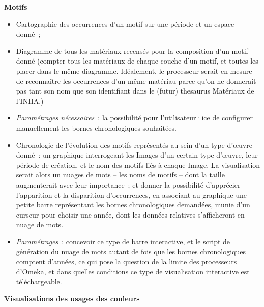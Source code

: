 \documentclass[a4paper,12pt, twoside]{book}
\begin{document}
\large \textbf{\textcolor{teal2}{Motifs}}\\

\normalsize
\begin{itemize}
    \item Cartographie des occurrences d’un motif sur une période et un espace donné~;\\

    \item Diagramme de tous les matériaux recensés pour la composition d’un motif donné (compter tous les matériaux de chaque couche d’un motif, et toutes les placer dans le même diagramme. Idéalement, le processeur serait en mesure de reconnaître les occurrences d’un même matériau parce qu’on ne donnerait pas tant son nom que son identifiant dans le (futur) thesaurus Matériaux de l’INHA.)\\

    \item \textit{Paramétrages nécessaires}~: la possibilité pour l’utilisateur·ice de configurer manuellement les bornes chronologiques souhaitées.\\

    \item Chronologie de l’évolution des motifs représentés au sein d’un type d’œuvre donné~: un graphique interrogeant les \textsf{Images} d’un certain \textsf{type d’œuvre}, leur période de création, et le nom des motifs liés à chaque \textsf{Image}. La visualisation serait alors un nuages de mots – les noms de motifs – dont la taille augmenterait avec leur importance~; et donner la possibilité d’apprécier l’apparition et la disparition d’occurrences, en associant au graphique une petite barre représentant les bornes chronologiques demandées, munie d’un curseur pour choisir une année, dont les données relatives s’afficheront en nuage de mots.\\

    \item \textit{Paramétrages}~: concevoir ce type de barre interactive, et le script de génération du nuage de mots autant de fois que les bornes chronologiques comptent d’années, ce qui pose la question de la limite des processeurs d’Omeka, et dans quelles conditions ce type de visualisation interactive est téléchargeable.
\end{itemize}

\large \textbf{\textcolor{teal2}{Visualisations des usages des couleurs}}\\
\end{document}
